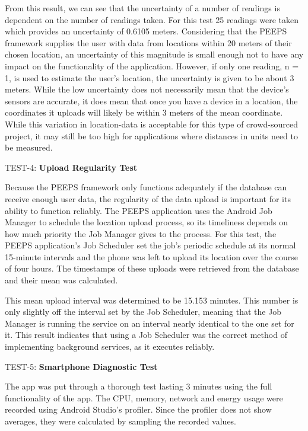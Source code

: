 From this result, we can see that the uncertainty of a number of readings is dependent on the number of readings taken. For this test 25 readings were taken which provides an uncertainty of 0.6105 meters. Considering that the PEEPS framework supplies the user with data from locations within 20 meters of their chosen location, an uncertainty of this magnitude is small enough not to have any impact on the functionality of the application. However, if only one reading, n = 1, is used to estimate the user's location, the uncertainty is given to be about 3 meters. While the low uncertainty does not necessarily mean that the device's sensors are accurate, it does mean that once you have a device in a location, the coordinates it uploads will likely be within 3 meters of the mean coordinate. While this variation in location-data is acceptable for this type of crowd-sourced project, it may still be too high for applications where distances in units need to be measured.

TEST-4: \textbf{Upload Regularity Test}

Because the PEEPS framework only functions adequately if the database can receive enough user data, the regularity of the data upload is important for its ability to function reliably. The PEEPS application uses the Android Job Manager to schedule the location upload process, so its timeliness depends on how much priority the Job Manager gives to the process. For this test, the PEEPS application's Job Scheduler set the job's periodic schedule at its normal 15-minute intervals and the phone was left to upload its location over the course of four hours. The timestamps of these uploads were retrieved from the database and their mean was calculated. 

This mean upload interval was determined to be 15.153 minutes. This number is only slightly off the interval set by the Job Scheduler, meaning that the Job Manager is running the service on an interval nearly identical to the one set for it. This result indicates that using a Job Scheduler was the correct method of implementing background services, as it executes reliably. 

TEST-5: \textbf{Smartphone Diagnostic Test}

The app was put through a thorough test lasting 3 minutes using the full functionality of the app. The CPU, memory, network and energy usage were recorded using Android Studio's profiler. Since the profiler does not show averages, they were calculated by sampling the recorded values.

